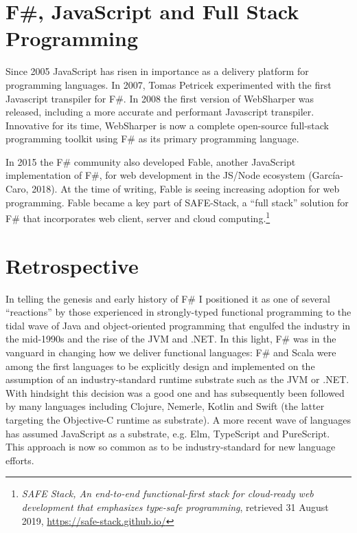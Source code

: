 \documentclass[acmsmall]{acmart}\settopmatter{}
\begin{document}
\section*{F\#, JavaScript and Full Stack Programming}

Since 2005 JavaScript has risen in importance as a delivery platform for programming languages. In 2007, Tomas Petricek
experimented with the first Javascript transpiler for F\#. In 2008 the first version of WebSharper was released, including
a more accurate and performant Javascript transpiler.  Innovative for its time, WebSharper is now a complete
open-source full-stack programming toolkit using F\# as its primary programming language.

In 2015 the F\# community also developed Fable, another JavaScript implementation of F\#, for web development
in the JS/Node ecosystem (García-Caro, 2018). At the time of writing, Fable is seeing increasing adoption for web
programming.  Fable became a key part of SAFE-Stack, a “full stack” solution for F\# that incorporates web client, server and cloud
computing.\footnote{\textit{SAFE Stack, An end-to-end functional-first stack for cloud-ready web development that emphasizes type-safe programming}, retrieved 31 August 2019,  \url{https://safe-stack.github.io/}}


\section*{Retrospective}

In telling the genesis and early history of F\# I positioned it as one of several “reactions” by those experienced
in strongly-typed functional programming to the tidal wave of Java and object-oriented programming that
engulfed the industry in the mid-1990s and the rise of the JVM and .NET.  In this light, F\# was in the vanguard
in changing how we deliver functional languages: F\# and Scala were among the first languages to be explicitly
design and implemented on the assumption of an industry-standard runtime substrate such as the JVM or .NET.
With hindsight this decision was a good one and has subsequently been followed by many languages including
Clojure, Nemerle, Kotlin and Swift (the latter targeting the Objective-C runtime as substrate). A more recent
wave of languages has assumed JavaScript as a substrate, e.g. Elm, TypeScript and PureScript.  This approach is
now so common as to be industry-standard for new language efforts.
\end{document}
